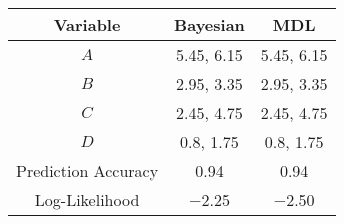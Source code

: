 \scriptsize
\begin{tabular}{@{}ccc@{}}
    \toprule
    Variable & Bayesian & MDL \\
    \midrule
    $A$ & \num{5.45}, \num{6.15} & \num{5.45}, \num{6.15} \\
    $B$ & \num{2.95}, \num{3.35} & \num{2.95}, \num{3.35} \\
    $C$ & \num{2.45}, \num{4.75} & \num{2.45}, \num{4.75} \\
    $D$ & \num{0.8}, \num{1.75} & \num{0.8}, \num{1.75} \\
    \midrule
    Prediction Accuracy & \num{0.94} & \num{0.94} \\
    \midrule
    Log-Likelihood & \num{-2.25} & \num{-2.50} \\
    \bottomrule
\end{tabular}
